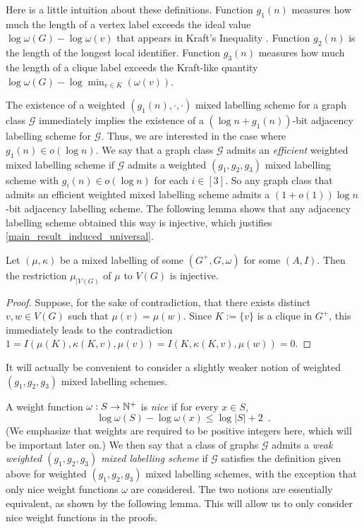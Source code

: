 \documentclass{patmorin}
\renewcommand{\leq}{\leqslant}
\newcommand{\david}[1]{\noindent{\color{orange} DW: #1}}
\newcommand{\vida}[1]{\noindent{\color{pink} VD: #1}}
\newcommand{\defin}[1]{\emph{\textcolor{brightmaroon}{#1}}}
\newcommand{\calG}{\mathcal{G}}
\begin{document}
Here is a little intuition about these definitions. Function $g_1(n)$ measures how much the length of a vertex label exceeds the ideal value $\log \omega(G) - \log\omega(v)$ that appears in Kraft's Inequality \cite{Kraft1949}. Function $g_2(n)$ is the length of the longest local identifier. Function $g_3(n)$ measures how much the length of a clique label exceeds the Kraft-like quantity $\log\omega(G)-\log\min_{v\in K}(\omega(v))$.


The existence of a weighted $(g_1(n),\cdot,\cdot)$ mixed labelling scheme for a graph class $\calG$ immediately implies the existence of a $(\log n+g_1(n))$-bit adjacency labelling scheme for $\calG$. Thus, we are interested in the case where $g_1(n)\in o(\log n)$. We say that a graph class $\calG$ admits an \defin{efficient} weighted mixed labelling scheme if $\calG$ admits a weighted $(g_1,g_2,g_3)$ mixed labelling scheme with $g_i(n)\in o(\log n)$ for each $i\in [3]$. So any graph class that admits an efficient weighted mixed labelling scheme admits a $(1+o(1))\log n$-bit adjacency labelling scheme. The following lemma shows that any adjacency labelling scheme obtained this way is injective, which justifies \cref{main_result_induced_universal}.

\begin{lem}
  Let $(\mu,\kappa)$ be a mixed labelling of some $(G^+,G,\omega)$ for some $(A,I)$. Then the restriction $\mu_{|V(G)}$ of $\mu$ to $V(G)$ is injective.
\end{lem}

\begin{proof}
  Suppose, for the sake of contradiction, that there exists distinct $v,w\in V(G)$ such that $\mu(v)=\mu(w)$. Since  $K:=\{v\}$ is a clique in $G^+$, this immediately leads to the contradiction
  $1=I(\mu(K),\kappa(K,v),\mu(v))=I(K,\kappa(K,v),\mu(w))=0$.
\end{proof}



It will actually be convenient to consider a slightly weaker notion of weighted $(g_1,g_2,g_3)$ mixed labelling schemes.

A weight function $\omega:S\to \mathbb{N}^+$ is \defin{nice} if
for every $x\in S$,
\[
  \log \omega(S) - \log \omega(x) \leq \log |S| + 2\enspace.
\]
(We emphasize that weights are required to be positive integers here, which will be important later on.)
We then say that a class of graphs $\calG$ admits a \defin{weak weighted $(g_1,g_2,g_3)$ mixed labelling scheme} if $\calG$ satisfies the definition given above for weighted $(g_1,g_2,g_3)$ mixed labelling schemes, with the exception that only nice weight functions $\omega$ are considered.
The two notions are essentially equivalent, as shown by the following lemma. This will allow us to only consider nice weight functions in the proofs.
\end{document}
